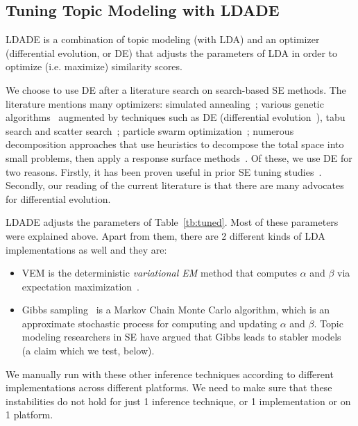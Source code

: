 \documentclass[twocolumn,5p,sort&compress]{elsarticle}
\newcommand{\bi}{\begin{itemize}}
\newcommand{\ei}{\end{itemize}}
\theoremstyle{break}
\begin{document}
\subsection{Tuning Topic Modeling with LDADE}
\label{sect:tuning}
LDADE is a combination of topic modeling (with LDA) and an optimizer (differential evolution, or DE) that adjusts
the parameters of LDA in order to optimize (i.e. maximize) similarity scores.

We choose to use DE after a literature search on search-based SE methods.
The literature mentions many optimizers: simulated
annealing~\cite{feather2002converging, menzies2007business}; various genetic
algorithms~\cite{goldberg1979complexity} augmented by techniques such as
DE (differential evolution~\cite{storn1997differential}), tabu search and scatter
search~\cite{glover1986general, beausoleil2006moss, molina2007sspmo,nebro2008abyss}; particle swarm optimization~\cite{pan2008particle}; numerous
decomposition approaches that use heuristics to decompose the total space into
small problems, then apply a response surface methods~\cite{krall2015gale, zuluaga2013active}.
Of these, we use DE for two reasons. Firstly, it has been proven useful in prior SE tuning
studies~\cite{fu2016tuning}. Secondly, our reading of the current literature is
that there are many advocates for differential evolution.

LDADE  adjusts the parameters of
Table~\ref{tb:tuned}. Most of these parameters were explained above. Apart from them, there are 2 different kinds of LDA implementations as well and they are:
\bi
\item VEM is the deterministic {\em variational EM} method that computes $\alpha$ and $\beta$ via
  expectation maximization~\cite{minka2002expectation}.
\item Gibbs sampling~\cite{wei2006lda, griffiths2004finding} is a Markov Chain Monte Carlo algorithm, which is an approximate stochastic process for computing and updating $\alpha$ and $\beta$.
  Topic modeling researchers in SE have argued that Gibbs leads to stabler models~\cite{layman16a,layman2016topic} (a claim which we test, below).
  \ei

We manually run with these other inference techniques according to different implementations across different platforms. We need to make sure that these instabilities do not hold for just 1 inference technique, or 1 implementation or on 1 platform.
\end{document}

